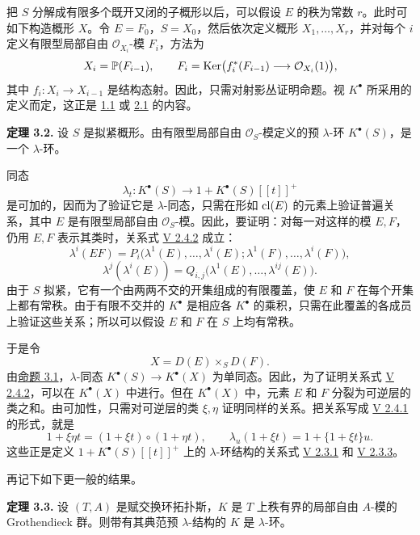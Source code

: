 把 \(S\) 分解成有限多个既开又闭的子概形以后，可以假设 \(E\) 的秩为常数 \(r\)。此时可如下构造概形 \(X\)。令 \(E=F_0\)，\(S=X_0\)，然后依次定义概形 \(X_1,\ldots,X_r\)，并对每个 \(i\) 定义有限型局部自由 \(\mathcal O_{X_i}\)-模 \(F_i\)，方法为
\[
  X_i=\mathbb P(F_{i-1}),\qquad
  F_i=\operatorname{Ker}\bigl(f_i^*(F_{i-1})\longrightarrow \mathcal O_{X_i}(1)\bigr),
\]
其中 \(f_i:X_i\to X_{i-1}\) 是结构态射。因此，只需对射影丛证明命题。视 \(K^\bullet\) 所采用的定义而定，这正是 \hyperlink{sga6.e06.thm.1-1}{1.1} 或 \hyperlink{sga6.e06.thm.2-1}{2.1} 的内容。

\textbf{定理 3.2.} 设 \(S\) 是拟紧概形。由有限型局部自由 \(\mathcal O_S\)-模定义的预 \(\lambda\)-环 \(K^\bullet(S)\)，是一个 \(\lambda\)-环。

同态
\[
  \lambda_t:K^\bullet(S)\longrightarrow 1+K^\bullet(S)[[t]]^+
\]
是可加的，因而为了验证它是 \(\lambda\)-同态，只需在形如 \(\operatorname{cl}(E)\) 的元素上验证普遍关系，其中 \(E\) 是有限型局部自由 \(\mathcal O_S\)-模。因此，要证明：对每一对这样的模 \(E,F\)，仍用 \(E,F\) 表示其类时，关系式 \hyperlink{sga6.e05.eq.2-4-2}{V 2.4.2} 成立：
\[
  \lambda^i(EF)=P_i\bigl(\lambda^1(E),\ldots,\lambda^i(E);\lambda^1(F),\ldots,\lambda^i(F)\bigr),
\]
\[
  \lambda^j(\lambda^i(E))=Q_{i,j}\bigl(\lambda^1(E),\ldots,\lambda^{ij}(E)\bigr).
\]
由于 \(S\) 拟紧，它有一个由两两不交的开集组成的有限覆盖，使 \(E\) 和 \(F\) 在每个开集上都有常秩。由于有限不交并的 \(K^\bullet\) 是相应各 \(K^\bullet\) 的乘积，只需在此覆盖的各成员上验证这些关系；所以可以假设 \(E\) 和 \(F\) 在 \(S\) 上均有常秩。

于是令
\[
  X=D(E)\times_S D(F).
\]
由\hyperlink{sga6.e06.prop.3-1}{命题 3.1}，\(\lambda\)-同态 \(K^\bullet(S)\to K^\bullet(X)\) 为单同态。因此，为了证明关系式 \hyperlink{sga6.e05.eq.2-4-2}{V 2.4.2}，可以在 \(K^\bullet(X)\) 中进行。但在 \(K^\bullet(X)\) 中，元素 \(E\) 和 \(F\) 分裂为可逆层的类之和。由可加性，只需对可逆层的类 \(\xi,\eta\) 证明同样的关系。把关系写成 \hyperlink{sga6.e05.eq.2-4-1}{V 2.4.1} 的形式，就是
\[
  1+\xi\eta t=(1+\xi t)\circ(1+\eta t),
  \qquad
  \lambda_u(1+\xi t)=1+\{1+\xi t\}u.
\]
这些正是定义 \(1+K^\bullet(S)[[t]]^+\) 上的 \(\lambda\)-环结构的关系式 \hyperlink{sga6.e05.eq.2-3-1}{V 2.3.1} 和 \hyperlink{sga6.e05.eq.2-3-3}{V 2.3.3}。

再记下如下更一般的结果。

\textbf{定理 3.3.} 设 \((T,A)\) 是赋交换环拓扑斯，\(K\) 是 \(T\) 上秩有界的局部自由 \(A\)-模的 Grothendieck 群。则带有其典范预 \(\lambda\)-结构的 \(K\) 是 \(\lambda\)-环。


